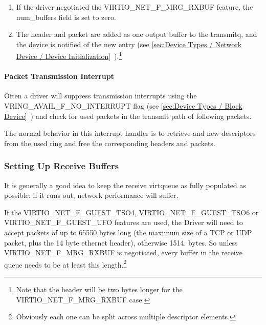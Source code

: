\begin{enumerate}
\begin{itemize}
  \item If the driver negotiated the VIRTIO_NET_F_HOST_ECN feature,
    the VIRTIO_NET_HDR_GSO_ECN bit may be set in “gso_type” as
    well, indicating that the TCP packet has the ECN bit set.\footnote{This case is not handled by some older hardware, so is called out
specifically in the protocol.
}
   \end{itemize}

\item If the driver negotiated the VIRTIO_NET_F_MRG_RXBUF feature,
  the num_buffers field is set to zero.

\item The header and packet are added as one output buffer to the
  transmitq, and the device is notified of the new entry
  (see \ref{sec:Device Types / Network Device / Device Initialization}~).\footnote{Note that the header will be two bytes longer for the
VIRTIO_NET_F_MRG_RXBUF case.
}
\end{enumerate}

\paragraph{Packet Transmission Interrupt}\label{sec:Device Types / Network Device / Device Operation / Packet Transmission / Packet Transmission Interrupt}

Often a driver will suppress transmission interrupts using the
VRING_AVAIL_F_NO_INTERRUPT flag
 (see \ref{sec:Device Types / Block Device}~)
and check for used packets in the transmit path of following
packets.

The normal behavior in this interrupt handler is to retrieve and
new descriptors from the used ring and free the corresponding
headers and packets.

\subsubsection{Setting Up Receive Buffers}\label{sec:Device Types / Network Device / Device Operation / Setting Up Receive Buffers}

It is generally a good idea to keep the receive virtqueue as
fully populated as possible: if it runs out, network performance
will suffer.

If the VIRTIO_NET_F_GUEST_TSO4, VIRTIO_NET_F_GUEST_TSO6 or
VIRTIO_NET_F_GUEST_UFO features are used, the Driver will need to
accept packets of up to 65550 bytes long (the maximum size of a
TCP or UDP packet, plus the 14 byte ethernet header), otherwise
1514. bytes. So unless VIRTIO_NET_F_MRG_RXBUF is negotiated, every
buffer in the receive queue needs to be at least this length.\footnote{Obviously each one can be split across multiple descriptor
elements.
}

